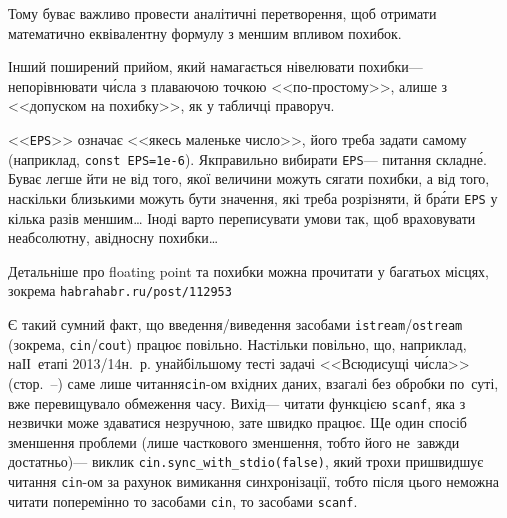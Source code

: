 \documentclass[14pt,a4paper]{extarticle}
\begin{document}
\hspace{0.5em plus 1em}
Тому буває важливо провести аналітичні перетворення, щоб отримати математично еквівалентну формулу з меншим впливом похибок. 

Інший поширений прийом, який намагається нівелювати похибки\nolinebreak[3] --- не\nolinebreak[2] порівнювати ч\'{и}сла з плаваючою точкою <<по-простому>>, а\nolinebreak[3] лише з <<допуском на похибку>>, як у табличці праворуч.

<<\texttt{EPS}>> означає <<якесь маленьке число>>, його треба задати самому (наприклад, \texttt{const \mbox{EPS=1e-6}}). Як\nolinebreak[3] правильно вибирати \texttt{EPS}\nolinebreak[3] --- питання складн\'{е}. Буває легше йти не від того, якої величини можуть сягати похибки, а від того, наскільки близькими можуть бути значення, які треба розрізняти, й бр\'{а}ти \texttt{EPS} у кілька разів меншим\dots{} Іноді варто переписувати умови так, щоб враховувати не\nolinebreak[3] абсолютну, а\nolinebreak[3] відносну похибки\dots

Детальніше про floating point та похибки можна прочитати у багатьох місцях, зокрема \verb"habrahabr.ru/post/112953"\label{text:floating-point-end}

\label{text:io-streams-versus-scanf-printf}
Є такий сумний факт, що введення/\nolinebreak[2]виведення засобами \texttt{istream}/\nolinebreak[2]\texttt{ostream} (зокрема, \texttt{cin}/\nolinebreak[2]\texttt{cout}) працює повільно. Настільки повільно, що, наприклад, на\nolinebreak[2] ІІ~етапі 2013/14\nolinebreak[3] н.~р. у\nolinebreak[2] найбільшому тесті задачі <<Всюдисущі ч\'{и}сла>> (стор.~\mbox{\pageref{sec:omnipresent-numbers}--\pageref{text:omnipresent-numbers-end}}) саме лише читання\nolinebreak[1] \mbox{\verb"cin"-ом} вхідних даних, взагалі без обробки по~суті, вже перевищувало обмеження часу. Вихід\nolinebreak[3] --- читати функцією \texttt{scanf}, яка з незвички може здаватися незруч\-ною, зате швидко працює. Ще один спосіб зменшення проблеми (лише часткового зменшення, тобто його не~завжди достатньо)\nolinebreak[3] --- виклик \verb"cin.sync_with_stdio(false)", який трохи пришвидшує читання \verb"cin"-ом за рахунок вимикання синхронізації, тобто після цього не\nolinebreak[3] можна читати поперемінно то засобами \verb"cin", то засобами \verb"scanf".
\end{document}
